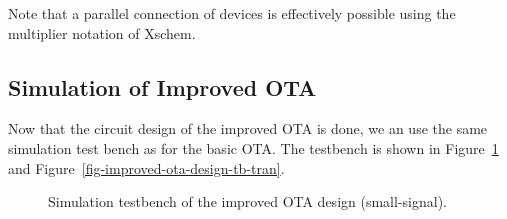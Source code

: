 \documentclass[
  a4paper,
  DIV=11,
  numbers=noendperiod]{scrartcl}
\begin{document}
\begin{tcolorbox}[enhanced jigsaw, titlerule=0mm, left=2mm, coltitle=black, toprule=.15mm, breakable, opacitybacktitle=0.6, colframe=quarto-callout-note-color-frame, bottomtitle=1mm, toptitle=1mm, opacityback=0, colbacktitle=quarto-callout-note-color!10!white, title=\textcolor{quarto-callout-note-color}{\faInfo}\hspace{0.5em}{Parallel Connection}, arc=.35mm, rightrule=.15mm, colback=white, bottomrule=.15mm, leftrule=.75mm]

Note that a parallel connection of devices is effectively possible using
the multiplier notation of Xschem.

\end{tcolorbox}

\subsection{Simulation of Improved
OTA}\label{simulation-of-improved-ota}

Now that the circuit design of the improved OTA is done, we an use the
same simulation test bench as for the basic OTA. The testbench is shown
in Figure~\ref{fig-improved-ota-design-tb-ac} and
Figure~\ref{fig-improved-ota-design-tb-tran}.

\begin{figure}


\caption{\label{fig-improved-ota-design-tb-ac}Simulation testbench of
the improved OTA design (small-signal).}

\end{figure}%
\end{document}
